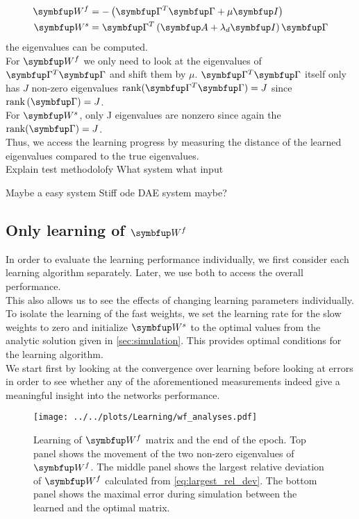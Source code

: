 \begin{equation}
\begin{aligned}
	\bmu{W}^f &= -\left(\bmu{\Gamma}^T\bmu{\Gamma} + \mu \bmu{I}\right)\\
	\bmu{W}^s &= \bmu{\Gamma}^T\left(\bmu{A} + \lambda_d\bmu{I}\right)\bmu{\Gamma}\\
\end{aligned}
\end{equation}
the eigenvalues can be computed.\\
For $\bmu{W}^f$ we only need to look at the eigenvalues of $\bmu{\Gamma}^T\bmu{\Gamma}$ and shift them by $\mu$. $\bmu{\Gamma}^T\bmu{\Gamma}$ itself only has $J$ non-zero eigenvalues $\text{rank}(\bmu{\Gamma}^T\bmu{\Gamma}) = J$ since $\text{rank}\left(
\bmu{\Gamma}\right) = J$.\\
For $\bmu{W}^s$, only J eigenvalues are nonzero since again the $\text{rank}(\bmu{\Gamma}) = J$.\\
Thus, we access the learning progress by measuring the distance of the learned eigenvalues compared to the true eigenvalues.\\



Explain test methodolofy
What system
what input

Maybe a easy system
Stiff ode
DAE system maybe?
\subsection{Only learning of $\bmu{W}^f$}
In order to evaluate the learning performance individually, we first consider each learning algorithm separately. Later, we use both to access the overall performance.\\
This also allows us to see the effects of changing learning parameters individually. To isolate the learning of the fast weights, we set the learning rate for the slow weights to zero and initialize $\bmu{W}^s$ to the optimal values from the analytic solution given in \cref{sec:simulation}. This provides optimal conditions for the learning algorithm.\\
We start first by looking at the convergence over learning before looking at errors in order to see whether any of the aforementioned measurements indeed give a meaningful insight into the networks performance.\\

\begin{figure}
	\centering
	\texttt{[image: ../../plots/Learning/wf\_analyses.pdf]}
	\caption{Learning of $\bmu{W}^f$ matrix and the end of the epoch. Top panel shows the movement of the two non-zero eigenvalues of $\bmu{W}^f$. The middle panel shows the largest relative deviation of $\bmu{W}^f$ calculated from \cref{eq:largest_rel_dev}. The bottom panel shows the maximal error during simulation between the learned and the optimal matrix.}
	\label{fig:wf_analyses}
\end{figure}

